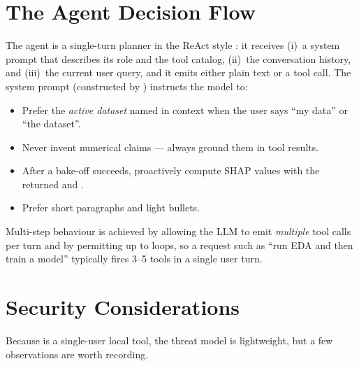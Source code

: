 \section{The Agent Decision Flow}
\label{sec:agent-flow}

The agent is a single-turn planner in the ReAct style
\citep{yao2023react}: it receives (i)~a system prompt that describes
its role and the tool catalog, (ii)~the conversation history, and
(iii)~the current user query, and it emits either plain text or a
tool call. The system prompt (constructed by
) instructs the model
to:

\begin{itemize}[leftmargin=1.4em]
  \item Prefer the \emph{active dataset} named in context when the
        user says ``my data'' or ``the dataset''.
  \item Never invent numerical claims --- always ground them in tool
        results.
  \item After a bake-off succeeds, proactively compute SHAP values
        with the returned  and
        .
  \item Prefer short paragraphs and light bullets.
\end{itemize}

Multi-step behaviour is achieved by allowing the LLM to emit
\emph{multiple} tool calls per turn and by permitting up to
 loops, so a request such as ``run EDA
and then train a model'' typically fires 3--5 tools in a single
user turn.

\section{Security Considerations}
\label{sec:security-mcp}

Because \projname{} is a single-user local tool, the threat model is
lightweight, but a few observations are worth recording.

